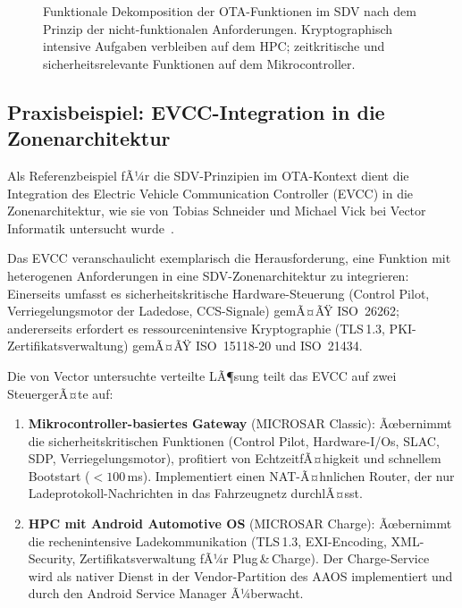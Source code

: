 ﻿\documentclass[12pt,a4paper,twoside]{article}
\begin{document}
\begin{figure}[htbp]
  \caption{Funktionale Dekomposition der OTA-Funktionen im SDV nach dem
    Prinzip der nicht-funktionalen Anforderungen. Kryptographisch intensive
    Aufgaben verbleiben auf dem HPC; zeitkritische und sicherheitsrelevante
    Funktionen auf dem Mikrocontroller.}
  \label{fig:sdv_decomposition}
\end{figure}

\subsection{Praxisbeispiel: EVCC-Integration in die Zonenarchitektur}
\label{subsec:evcc_praxis}

Als Referenzbeispiel fÃ¼r die SDV-Prinzipien im OTA-Kontext dient die
Integration des Electric Vehicle Communication Controller (EVCC) in die
Zonenarchitektur, wie sie von Tobias Schneider und Michael Vick bei Vector
Informatik untersucht wurde~\cite{schneider2026ladekomm}.

Das EVCC veranschaulicht exemplarisch die Herausforderung, eine Funktion
mit heterogenen Anforderungen in eine SDV-Zonenarchitektur zu integrieren:
Einerseits umfasst es sicherheitskritische Hardware-Steuerung (Control Pilot,
Verriegelungsmotor der Ladedose, CCS-Signale) gemÃ¤ÃŸ ISO~26262; andererseits
erfordert es ressourcenintensive Kryptographie (TLS\,1.3, PKI-Zertifikatsverwaltung)
gemÃ¤ÃŸ ISO~15118-20 und ISO~21434.

Die von Vector untersuchte verteilte LÃ¶sung teilt das EVCC auf zwei SteuergerÃ¤te auf:

\begin{enumerate}
  \item \textbf{Mikrocontroller-basiertes Gateway} (MICROSAR Classic):
    Ãœbernimmt die sicherheitskritischen Funktionen (Control Pilot, Hardware-I/Os,
    SLAC, SDP, Verriegelungsmotor), profitiert von EchtzeitfÃ¤higkeit und schnellem
    Bootstart ($<100$\,ms). Implementiert einen NAT-Ã¤hnlichen Router, der nur
    Ladeprotokoll-Nachrichten in das Fahrzeugnetz durchlÃ¤sst.
  \item \textbf{HPC mit Android Automotive OS} (MICROSAR Charge):
    Ãœbernimmt die rechenintensive Ladekommunikation (TLS\,1.3, EXI-Encoding,
    XML-Security, Zertifikatsverwaltung fÃ¼r Plug\,\&\,Charge). Der Charge-Service
    wird als nativer Dienst in der Vendor-Partition des AAOS implementiert
    und durch den Android Service Manager Ã¼berwacht.
\end{enumerate}
\end{document}
